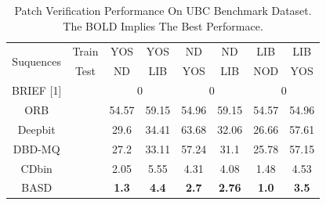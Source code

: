 \documentclass{svproc}
\begin{document}
\begin{table}[h]
\centering
\scriptsize
\caption{Patch Verification Performance On UBC Benchmark Dataset. The BOLD Implies The Best Performace.}
\label{table_example}
\begin{center}
\begin{tabular}{cccccccc}
\toprule
\midrule
\multirow{2}{*}{Suquences} & \multicolumn{1}{c}{Train} & \multicolumn{1}{c}{YOS} & \multicolumn{1}{c}{YOS}  & \multicolumn{1}{c}{ND}  & \multicolumn{1}{c}{ND}  & \multicolumn{1}{c}{LIB}   & \multicolumn{1}{c}{LIB}  \\
  \cline{3-8}
                           & \multicolumn{1}{c}{Test} & \multicolumn{1}{c}{ND} & \multicolumn{1}{c}{LIB}  & \multicolumn{1}{c}{YOS}  & \multicolumn{1}{c}{LIB}  & \multicolumn{1}{c}{NOD}   & \multicolumn{1}{c}{YOS}  \\
  \cline{3-8}


\multirow{1}{*}{BRIEF [1]}     & \multicolumn{1}{c}{ }                                         & \multicolumn{2}{c}{0}                                                 & \multicolumn{2}{c}{0}                                         & \multicolumn{2}{c}{0}  \\
  \cline{3-8}
\multirow{1}{*}{ORB}   & \multicolumn{1}{c}{} & \multicolumn{1}{c}{54.57} & \multicolumn{1}{c}{59.15} & \multicolumn{1}{c}{54.96}  & \multicolumn{1}{c}{59.15}  & \multicolumn{1}{c}{54.57}  & \multicolumn{1}{c}{54.96}  \\
  \cline{3-8}
\multirow{1}{*}{Deepbit} & \multicolumn{1}{c}{}  & \multicolumn{1}{c}{29.6} & \multicolumn{1}{c}{34.41} & \multicolumn{1}{c}{63.68}  & \multicolumn{1}{c}{32.06}  & \multicolumn{1}{c}{26.66}  & \multicolumn{1}{c}{57.61}  \\
  \cline{3-8}
\multirow{1}{*}{DBD-MQ}   & \multicolumn{1}{c}{}  & \multicolumn{1}{c}{27.2} & \multicolumn{1}{c}{33.11} & \multicolumn{1}{c}{57.24}  & \multicolumn{1}{c}{31.1}  & \multicolumn{1}{c}{25.78}  & \multicolumn{1}{c}{57.15}  \\
  \cline{3-8}
\multirow{1}{*}{CDbin}   & \multicolumn{1}{c}{}  & \multicolumn{1}{c}{2.05} & \multicolumn{1}{c}{5.55} & \multicolumn{1}{c}{4.31}  & \multicolumn{1}{c}{4.08}  & \multicolumn{1}{c}{1.48}  & \multicolumn{1}{c}{4.53}  \\
  \cline{3-8}
\multirow{1}{*}{BASD}  & \multicolumn{1}{c}{}  & \multicolumn{1}{c}{\textbf{1.3}} & \multicolumn{1}{c}{\textbf{4.4}} & \multicolumn{1}{c}{\textbf{2.7}}  & \multicolumn{1}{c}{\textbf{2.76}}  & \multicolumn{1}{c}{\textbf{1.0}}  & \multicolumn{1}{c}{\textbf{3.5}}  \\
\midrule
\toprule
\end{tabular} 
\end{center}
\end{table}
\vspace{-0.47cm}
\end{document}
